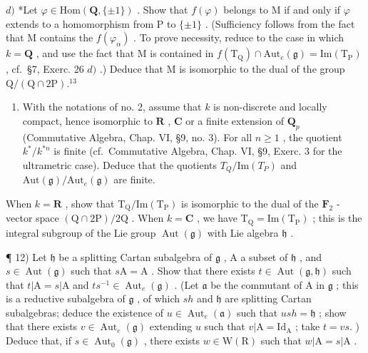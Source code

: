 \(d)\) *Let \(\varphi\in\mathrm{Hom}(\mathbf{Q},\{\pm1\})\) . Show that \(f(\varphi)\) belongs to M if and only if \(\varphi\) extends to a homomorphism from P to \(\{\pm1\}\) . (Sufficiency follows from the fact that M contains the \(f(\varphi_{\alpha})\) . To prove necessity, reduce to the case in which \(k=\mathbf{Q}\) , and use the fact that M is contained in \(f(\mathrm{T}_{\mathrm{Q}})\cap\mathrm{Aut}_{e}(\mathfrak{g})=\mathrm{Im}(\mathrm{T}_{\mathrm{P}})\) , cf.~§7, Exerc. 26 \(d)\) .) Deduce that M is isomorphic to the dual of the group \(\mathrm{Q}/(\mathrm{Q}\cap2\mathrm{P}).^{13}\)

\begin{enumerate}
\def\labelenumi{\arabic{enumi})}
\setcounter{enumi}{10}
\tightlist
\item
  With the notations of no. 2, assume that \(k\) is non-discrete and locally compact, hence isomorphic to \(\mathbf{R}\) , \(\mathbf{C}\) or a finite extension of \(\mathbf{Q}_p\) (Commutative Algebra, Chap. VI, §9, no. 3). For all \(n \geq 1\) , the quotient \(k^* / k^{*n}\) is finite (cf.~Commutative Algebra, Chap. VI, §9, Exerc. 3 for the ultrametric case). Deduce that the quotients \(T_Q / \text{Im}(T_P)\) and \(\text{Aut}(\mathfrak{g}) / \text{Aut}_e(\mathfrak{g})\) are finite.
\end{enumerate}

When \(k = \mathbf{R}\) , show that \(\mathrm{T_Q / Im(T_P)}\) is isomorphic to the dual of the \(\mathbf{F}_{2}\) -vector space \((\mathrm{Q} \cap 2\mathrm{P}) / 2\mathrm{Q}\) . When \(k = \mathbf{C}\) , we have \(\mathrm{T_Q = Im(T_P)}\) ; this is the integral subgroup of the Lie group \(\operatorname{Aut}(\mathfrak{g})\) with Lie algebra \(\mathfrak{h}\) .

¶ 12) Let \(\mathfrak{h}\) be a splitting Cartan subalgebra of \(\mathfrak{g}\) , A a subset of \(\mathfrak{h}\) , and \(s \in \operatorname{Aut}(\mathfrak{g})\) such that \(s\mathrm{A} = \mathrm{A}\) . Show that there exists \(t \in \operatorname{Aut}(\mathfrak{g}, \mathfrak{h})\) such that \(t|\mathrm{A} = s|\mathrm{A}\) and \(ts^{-1} \in \operatorname{Aut}_e(\mathfrak{g})\) . (Let \(\mathfrak{a}\) be the commutant of A in \(\mathfrak{g}\) ; this is a reductive subalgebra of \(\mathfrak{g}\) , of which \(sh\) and \(\mathfrak{h}\) are splitting Cartan subalgebras; deduce the existence of \(u \in \operatorname{Aut}_e(\mathfrak{a})\) such that \(ush = \mathfrak{h}\) ; show that there exists \(v \in \operatorname{Aut}_e(\mathfrak{g})\) extending \(u\) such that \(v|\mathrm{A} = \mathrm{Id}_{\mathrm{A}}\) ; take \(t = vs.\) ) Deduce that, if \(s \in \operatorname{Aut}_0(\mathfrak{g})\) , there exists \(w \in \mathrm{W}(\mathrm{R})\) such that \(w|\mathrm{A} = s|\mathrm{A}\) .

